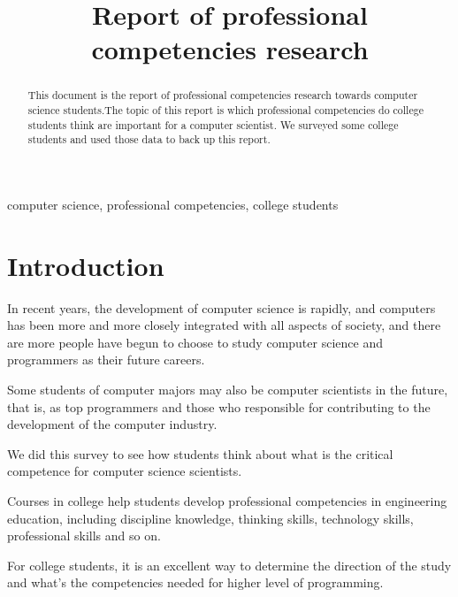 \documentclass[conference]{IEEEtran}
\begin{document}
\title{Report of professional competencies research\\
}

\author{
\and
{}
\and
{}
\and
{}
}

\maketitle

\begin{abstract}
This document is the report of professional competencies research towards computer science students.The topic of this report is which professional competencies do college students think are important for a computer scientist. We surveyed some college students and used those data to back up this report. 
\end{abstract}

\begin{IEEEkeywords}
computer science, professional competencies, college students
\end{IEEEkeywords}

\section{Introduction}
\par In recent years, the development of computer science is rapidly, and computers has been more and more closely integrated with all aspects of society, and there are more people have begun to choose to study computer science and programmers as their future careers.
\par Some students of computer majors may also be computer scientists in the future, that is, as top programmers and those who responsible for contributing to the development of the computer industry. 
\par We did this survey to see how students think about what is the critical competence for computer science scientists.
\par Courses in college help students develop professional competencies in engineering education, including discipline knowledge, thinking skills, technology skills, professional skills and so on.
\par For college students, it is an excellent way to determine the direction of the study and what's the competencies needed for higher level of programming.
\end{document}
